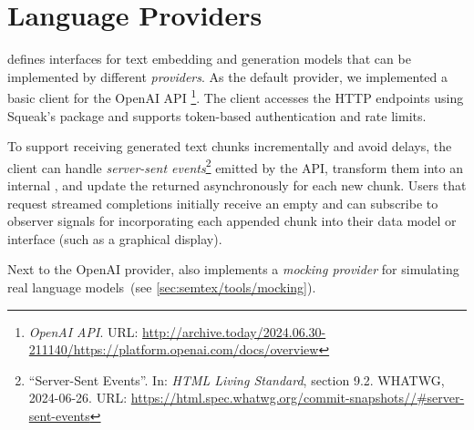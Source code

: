 
\section{Language Providers}
\label{sec:semtex/providers}

\semtex defines interfaces for text embedding and generation models that can be implemented by different \emph{providers}.
As the default provider, we implemented a basic client for the OpenAI API%
\footnote{
	\emph{OpenAI API}.
	URL:
	\url{http://archive.today/2024.06.30-211140/https://platform.openai.com/docs/overview}
}.
The client accesses the HTTP endpoints using Squeak's  package and supports token-based authentication and rate limits.

To support receiving generated text chunks incrementally and avoid delays, the client can handle \emph{server-sent events}\footnote{%
	``Server-Sent Events''.
	In: \emph{HTML Living Standard}, section 9.2.
	WHATWG, 2024-06-26.
	URL:
	\href{https://html.spec.whatwg.org/commit-snapshots/25aaad7f6a10785efe041fb05a597400e700ef10/\#server-sent-events}{https://html.spec.whatwg.org/commit-snapshots//\#server-sent-events}%
} emitted by the API, transform them into an internal , and update the returned  asynchronously for each new chunk.
Users that request streamed completions initially receive an empty  and can subscribe to observer signals for incorporating each appended chunk into their data model or interface (such as a graphical display).

Next to the OpenAI provider, \semtex also implements a \emph{mocking provider} for simulating real language models~(see \cref{sec:semtex/tools/mocking}).
